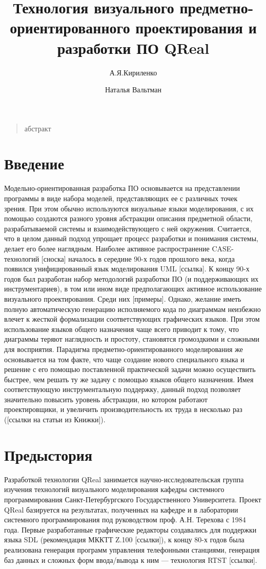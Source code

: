 \documentclass[a4paper]{article}
\title{Технология визуального предметно-ориентированного проектирования и разработки ПО QReal}
\author{А.Я.Кириленко \and Наталья Вальтман}
\date{}
\begin{document}
\maketitle
\thispagestyle{empty}

\begin{quote}
\small\noindent
абстракт
\end{quote}

\section*{Введение}

Модельно-ориентированная разработка ПО основывается на представлении программы в виде набора моделей, представляющих ее с различных точек зрения. При этом обычно используются визуальные языки моделирования, с их помощью создаются разного уровня абстракции описания предметной области, разрабатываемой системы и взаимодействующего с ней окружения. Считается, что в целом данный подход упрощает процесс разработки и понимания системы, делает его более наглядным. Наиболее активное распространение CASE-технологий [сноска] началось в середине 90-х годов прошлого века, когда появился унифицированный язык моделирования UML [ссылка]. К концу 90-х годов был разработан набор методологий разработки ПО (и поддерживающих их инструментариев), в том или ином виде предполагающих активное использование визуального проектирования. Среди них [примеры]. Однако, желание иметь полную автоматическую генерацию исполняемого кода по диаграммам неизбежно влечет к жесткой формализации соответствующих графических языков. При этом использование языков общего назначения чаще всего приводит к тому, что диаграммы теряют наглядность и простоту, становятся громоздкими и сложными для восприятия. Парадигма предметно-ориентированного моделирования же основывается на том факте, что чаще создание нового специального языка и решение с его помощью поставленной практической задачи можно осуществить быстрее, чем решать ту же задачу с помощью языков общего назначения. Имея соответствующую инструментальную поддержку, данный подход позволяет значительно повысить уровень абстракции, но котором работают проектировщики, и увеличить производительность их труда в несколько раз ([ссылки на статьи из Книжки]).

\section{Предыстория}

Разработкой технологии QReal занимается научно-исследовательская группа изучения технологий визуального моделирования кафедры системного программирования Санкт-Петербургского Государственного Университета. Проект QReal базируется на результатах, полученных на кафедре и в лаборатории системного программирования под руководством проф. А.Н. Терехова с 1984 года. Первые разработанные графические редакторы создавались для поддержки языка SDL (рекомендация МККТТ Z.100 [ссылки]), к концу 80-х годов была реализована генерация программ управления телефонными станциями, генерация баз данных и сложных форм ввода/вывода к ним — технология RTST [ссылки]. 
\end{document}
